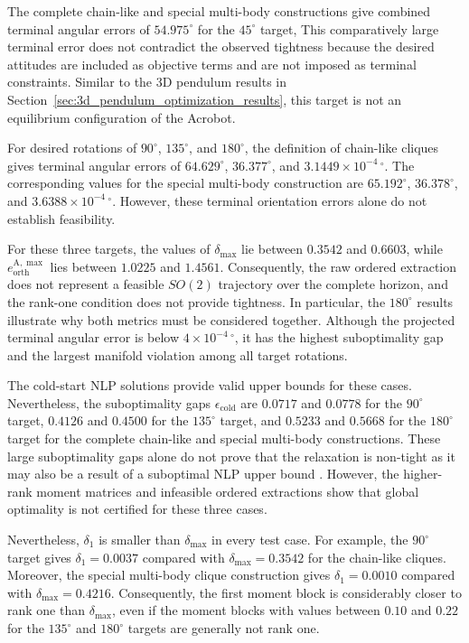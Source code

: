 The complete chain-like and special multi-body constructions give combined
terminal angular errors of $54.975^\circ$ for the $45^\circ$ target, 
This comparatively large
terminal error does not contradict the observed tightness because the desired
attitudes are included as objective terms and are not imposed as terminal
constraints. Similar to the $3$D pendulum results in
Section~\ref{sec:3d_pendulum_optimization_results}, this target is 
not an equilibrium configuration of the Acrobot.

For desired rotations of $90^\circ$, $135^\circ$, and $180^\circ$, the
definition of chain-like cliques gives terminal angular errors of $64.629^\circ$,
$36.377^\circ$, and
$3.1449\!\times\!10^{-4}\,{}^\circ$. The corresponding values
for the special multi-body construction are $65.192^\circ$,
$36.378^\circ$, and
$3.6388\!\times\!10^{-4}\,{}^\circ$. However, these terminal orientation
errors alone do not establish feasibility.

For these three targets, the values of $\delta_{\max}$ lie between $0.3542$
and $0.6603$, while $e_{\mathrm{orth}}^{\mathrm A,\max}$ lies between
$1.0225$ and $1.4561$. Consequently, the raw ordered extraction does
not represent a feasible $SO(2)$ trajectory over the complete horizon, and the
rank-one condition does not provide tightness. In particular, the 
$180^\circ$ results illustrate why both metrics must be considered together.
Although the projected terminal angular error is below
$4\!\times\!10^{-4}\,{}^\circ$, it has the highest
suboptimality gap and the largest manifold violation among all target rotations.

The cold-start NLP solutions provide
valid upper bounds for these cases. Nevertheless, the suboptimality gaps 
$\epsilon_{\mathrm{cold}}$ are
$0.0717$ and $0.0778$ for the $90^\circ$ target, $0.4126$ and $0.4500$ for
the $135^\circ$ target, and $0.5233$ and $0.5668$ for the $180^\circ$ target
for the complete chain-like and special multi-body constructions.
These large suboptimality gaps alone do not prove that the relaxation
is non-tight as it may also be a result of a suboptimal NLP upper bound \cite{Sangli2025}.
However, the higher-rank moment matrices and infeasible ordered
extractions show that global optimality is not certified for
these three cases.

Nevertheless, $\delta_1$ is smaller than $\delta_{\max}$ in every test case.
For example, the $90^\circ$ target gives $\delta_1=0.0037$
compared with $\delta_{\max}=0.3542$ for the chain-like cliques. Moreover, the 
special multi-body clique construction gives $\delta_1=0.0010$ compared with 
$\delta_{\max}=0.4216$. Consequently, the first
moment block is considerably closer to rank one than $\delta_{\max}$,
even if the moment blocks with values between $0.10$ and
$0.22$ for the $135^\circ$ and $180^\circ$ targets are generally not rank one.



